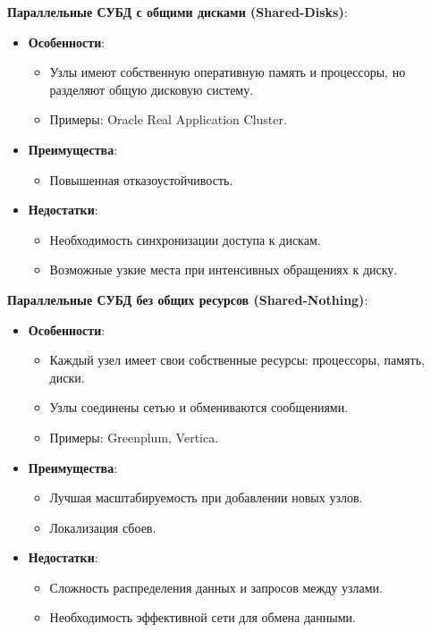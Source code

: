 \documentclass[a4paper,12pt]{article}
\begin{document}
\textbf{Параллельные СУБД с общими дисками (Shared-Disks)}:

\begin{itemize}
    \item \textbf{Особенности}:
    \begin{itemize}
        \item Узлы имеют собственную оперативную память и процессоры, но разделяют общую дисковую систему.
        \item Примеры: Oracle Real Application Cluster.
    \end{itemize}
    \item \textbf{Преимущества}:
    \begin{itemize}
        \item Повышенная отказоустойчивость.
    \end{itemize}
    \item \textbf{Недостатки}:
    \begin{itemize}
        \item Необходимость синхронизации доступа к дискам.
        \item Возможные узкие места при интенсивных обращениях к диску.
    \end{itemize}
\end{itemize}

\textbf{Параллельные СУБД без общих ресурсов (Shared-Nothing)}:

\begin{itemize}
    \item \textbf{Особенности}:
    \begin{itemize}
        \item Каждый узел имеет свои собственные ресурсы: процессоры, память, диски.
        \item Узлы соединены сетью и обмениваются сообщениями.
        \item Примеры: Greenplum, Vertica.
    \end{itemize}
    \item \textbf{Преимущества}:
    \begin{itemize}
        \item Лучшая масштабируемость при добавлении новых узлов.
        \item Локализация сбоев.
    \end{itemize}
    \item \textbf{Недостатки}:
    \begin{itemize}
        \item Сложность распределения данных и запросов между узлами.
        \item Необходимость эффективной сети для обмена данными.
    \end{itemize}
\end{itemize}
\end{document}
